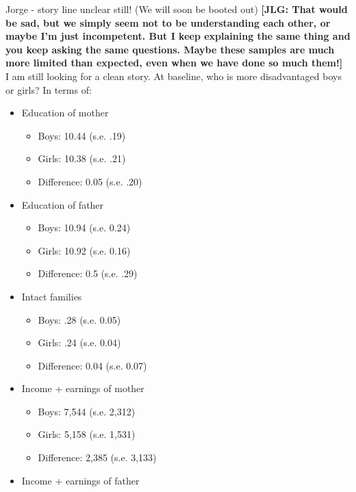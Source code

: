 


\newcommand*\leftright[2]{%
  \leavevmode
  \rlap{#1}%
  \hspace{0.5\linewidth}%
  #2}

\newcommand{\orth}{\ensuremath{\perp\!\!\!\perp}}%
\newcommand{\indep}{\orth}%
\newcommand{\notorth}{\ensuremath{\perp\!\!\!\!\!\!\diagup\!\!\!\!\!\!\perp}}%
\newcommand{\notindep}{\notorth}





\noindent Jorge - story line unclear still! (We will soon be booted out) \textbf{[JLG: That would be sad, but we simply seem not to be understanding each other, or maybe I'm just incompetent. But I keep explaining the same thing and you keep asking the same questions. Maybe these samples are much more limited than expected, even when we have done so much them!]}\\

\noindent I am still looking for a clean story. At baseline, who is more disadvantaged boys or girls? In terms of:\\


\begin{itemize}
\item Education of mother
	\begin{itemize}
		\item Boys: 10.44 (s.e. .19)
		\item Girls: 10.38 (s.e. .21)
		\item Difference: 0.05 (s.e. .20)
	\end{itemize}
\item Education of father
	\begin{itemize}
		\item Boys: 10.94 (s.e. 0.24)
		\item Girls: 10.92 (s.e. 0.16)
		\item Difference: 0.5 (s.e. .29)
	\end{itemize}
\item Intact families 
	\begin{itemize}
		\item Boys: .28 (s.e. 0.05)
		\item Girls: .24 (s.e. 0.04)
		\item Difference: 0.04 (s.e. 0.07)
	\end{itemize}
\item Income + earnings of mother
	\begin{itemize}
		\item  Boys: 7,544 (s.e. 2,312) 
		\item  Girls: 5,158 (s.e. 1,531)
		\item Difference: 2,385 (s.e. 3,133) 
	\end{itemize}
\item Income + earnings of father
\end{itemize}

